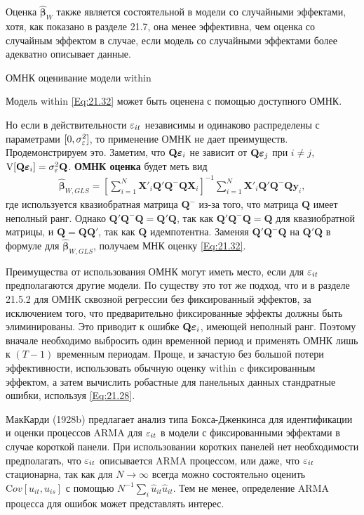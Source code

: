 Оценка $\hat{\bm\beta}_W$ также является состоятельной в модели со случайными эффектами, хотя, как показано в разделе 21.7, она менее эффективна, чем оценка со случайным эффектом в случае, если модель со случайными эффектами более адекватно описывает данные.

{\centering
ОМНК оценивание модели within\\}

Модель within \ref{Eq:21.32} может быть оценена с помощью доступного ОМНК.

Но если в действительности $\varepsilon_{it}$  независимы и одинаково распределены с параметрами $[0, \sigma^2_\varepsilon]$, то применение ОМНК не дает преимуществ. Продемонстрируем это. Заметим, что $\mathbf Q \bm{\varepsilon}_i$ не зависит от $\mathbf Q \bm{\varepsilon}_j$ при $i \neq j$, $\mathrm V[\mathbf Q \bm{\varepsilon}_i]=\sigma^2_\varepsilon \mathbf Q$.     \textbf{ОМНК оценка} будет меть вид
\begin{align}
\hat{\bm\beta}_{W,GLS}=\left[ \sum_{i=1}^N \mathbf X'_i \mathbf Q' \mathbf Q^{-} \mathbf Q \mathbf X_i \right]^{-1} 
\sum_{i=1}^N \mathbf X'_i \mathbf Q' \mathbf Q^{-} \mathbf Q \mathbf y_i,
\nonumber
\end{align}
где используется квазиобратная матрица $\mathbf Q^-$ из-за того, что матрица  $\mathbf Q$ имеет неполный ранг. Однако $\mathbf Q' \mathbf Q^{-} \mathbf Q =\mathbf Q' \mathbf Q$, так как $\mathbf Q' \mathbf Q^{-} \mathbf Q = \mathbf Q$ для квазиобратной матрицы, и $\mathbf Q= \mathbf Q \mathbf Q'$, так как $\mathbf Q$ идемпотентна. Заменяя  $\mathbf Q' \mathbf Q^{-} \mathbf Q $ на $\mathbf Q' \mathbf Q$ в формуле для $\hat{\bm\beta}_{W,GLS}$, получаем МНК оценку \ref{Eq:21.32}.

Преимущества от использования ОМНК могут иметь место, если для $\varepsilon_{it}$ предполагаются другие модели. По существу это тот же подход, что и в разделе 21.5.2 для ОМНК сквозной регрессии без фиксированный эффектов, за исключением того, что предварительно фиксированные эффекты должны быть элиминированы. Это приводит к ошибке $\mathbf Q\bm{\varepsilon}_i$, имеющей неполный ранг. Поэтому вначале необходимо выбросить один временной период и применять ОМНК лишь к $(T-1)$ временным периодам. Проще, и зачастую без большой потери эффективности, использовать обычную оценку within c фиксированным эффектом, а затем вычислить робастные для панельных данных стандратные ошибки, используя \ref{Eq:21.28}.

МакКарди (1928b) предлагает анализ типа Бокса-Дженкинса для идентификации и оценки процессов ARMA для $\varepsilon_{it}$ в модели с фиксированными эффектами в случае короткой панели. При использовании коротких панелей нет необходимости предполагать, что $\varepsilon_{it}$ описывается ARMA процессом, или даже, что $\varepsilon_{it}$ стационарна, так как для $N \rightarrow \infty$ всегда можно состоятельно оценить $\mathrm Cov[u_{it}, u_{is}]$ с помощью $N^{-1}\sum_i \hat{u}_{it}\hat{u}_{it}$. Тем не менее, определение ARMA процесса для ошибок может представлять интерес.


